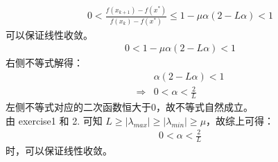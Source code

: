 \documentclass[11pt,letter,notitlepage]{article}
\begin{document}
\begin{solution}
\begin{enumerate}
\begin{align*}
            0<\frac{f\left(x_{k+1}\right)-f\left(x^{*}\right)}{f\left(x_{k}\right)-f\left(x^{*}\right)} \leqslant 1-\mu \alpha(2-L \alpha) < 1
        \end{align*}
        可以保证线性收敛。
        \begin{align*}
            0 < 1-\mu \alpha(2-L \alpha) < 1
        \end{align*}
        右侧不等式解得：
        \begin{align*}
            &\alpha(2-L \alpha) < 1 \\ \Rightarrow & 0<\alpha<\frac{2}{L}
        \end{align*}
        左侧不等式对应的二次函数恒大于0，故不等式自然成立。\\
        由 exercise1 和 2. 可知 $L \geqslant |\lambda_{max} | \geqslant |\lambda_{min} | \geqslant \mu$，故综上可得：
        \begin{align*}
            0<\alpha<\frac{2}{L}
        \end{align*}
        时，可以保证线性收敛。
    \end{enumerate}

\end{solution}
\newpage
\end{document}
